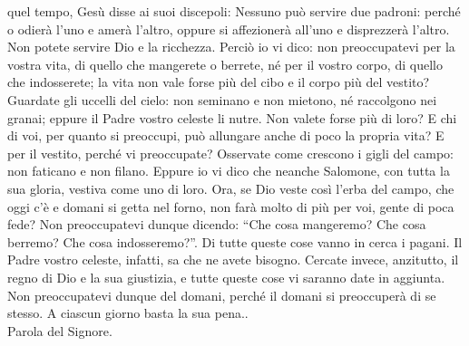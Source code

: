  quel tempo, Ges\`u disse ai suoi discepoli: \guillemotleft
Nessuno pu\`o
servire due padroni: perch\'e o odier\`a l'uno e amer\`a l'altro, oppure
si affezioner\`a all'uno
e disprezzer\`a l'altro. Non potete servire Dio e la ricchezza.
Perci\`o io vi dico: non preoccupatevi
per la vostra vita, di quello che mangerete o berrete, n\'e per il vostro
corpo, di quello che indosserete;
la vita non vale forse pi\`u del cibo e il corpo pi\`u del vestito?
Guardate gli uccelli del cielo: non
seminano e non mietono, n\'e raccolgono nei granai; eppure il
Padre vostro celeste li nutre. Non valete
forse pi\`u di loro? E chi di voi, per quanto si preoccupi, pu\`o
allungare anche di poco la propria vita?
E per il vestito, perch\'e vi preoccupate? Osservate come crescono
i gigli del campo: non faticano e non
filano. Eppure io vi dico che neanche Salomone, con tutta
la sua gloria, vestiva come uno di loro. Ora,
se Dio veste cos\`i l'erba del campo, che oggi c'\`e e domani
si getta nel forno, non far\`a molto di
pi\`u per voi, gente di poca fede? Non preoccupatevi dunque
dicendo: \mbox{``Che} cosa mangeremo? Che
cosa berremo? Che cosa indosseremo?''. Di tutte queste cose
vanno in cerca i pagani. Il Padre vostro
celeste, infatti, sa che ne avete bisogno. Cercate invece,
anzitutto, il regno di Dio e la sua giustizia,
e tutte queste cose vi saranno date in aggiunta. Non preoccupatevi
dunque del domani, perch\'e il domani
si preoccuper\`a di se stesso. A ciascun giorno basta la sua pena.\guillemotright.\\

Parola del Signore.\\


\vspace{10mm}


\newpage



